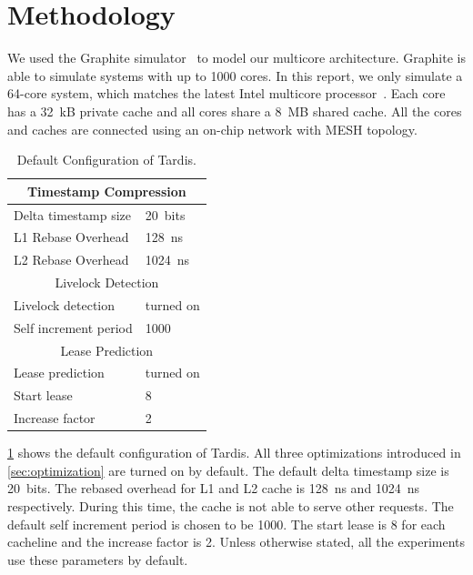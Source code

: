 \documentclass[12pt]{article}
\begin{document}
\section{Methodology}

We used the Graphite simulator~\cite{graphite} to model our multicore 
architecture. Graphite is able to simulate 
systems with up to 1000 cores. In this report, we only simulate a 
64-core system, which matches the latest Intel multicore 
processor~\cite{xeonphi}. Each core has a 32~kB private cache and all 
cores share a 8~MB shared cache. All the cores and caches are 
connected using an on-chip network with MESH topology.

\begin{table}
	\caption{ Default Configuration of Tardis. }
	\begin{center}
	{ 
		\begin{tabular}{|l|l|}
            \hline
			\multicolumn{2}{|c|}{Timestamp Compression} \\
			\hline
			Delta timestamp size 		& 20~bits \\
			L1 Rebase Overhead 			& 128~ns\\
			L2 Rebase Overhead			& 1024~ns \\
			\hline
			\multicolumn{2}{|c|}{Livelock Detection} \\
			\hline
			Livelock detection 			& turned on \\
			Self increment period 		& 1000 \\
			\hline
			\multicolumn{2}{|c|}{Lease Prediction} \\
			\hline
			Lease prediction			& turned on \\
			Start lease 				& 8 \\
			Increase factor				& 2 \\
			\hline
		\end{tabular}
    }
	\end{center}
    \label{tab:system}
	\vspace{-.2in}
\end{table}

\cref{tab:system} shows the default configuration of Tardis. All 
three optimizations introduced in \cref{sec:optimization} are turned 
on by default. The default delta timestamp size is 20~bits. The
rebased overhead for L1 and L2 cache is 128~ns and 1024~ns 
respectively. During this time, the cache is not able to serve other 
requests. The default self increment period is chosen to be 1000. The 
start lease is 8 for each cacheline and the increase factor is 2. 
Unless otherwise stated, all the experiments use these parameters by 
default.
\end{document}
